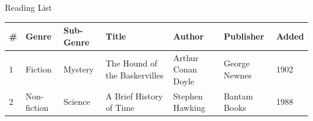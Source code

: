 \documentclass[11pt,a4paper]{article}
\begin{document}
Reading List

\begin{table}[h]
\begin{tabular}{|l|l|l|l|l|l|l|}
\hline
\# & Genre & Sub-Genre & Title & Author & Publisher & Added \\ \hline
1 & Fiction & Mystery & The Hound of the Baskervilles & Arthur Conan Doyle & George Newnes & 1902 \\ \hline
2 & Non-fiction & Science & A Brief History of Time & Stephen Hawking & Bantam Books & 1988 \\ \hline
\end{tabular}
\end{table}
\end{document}
